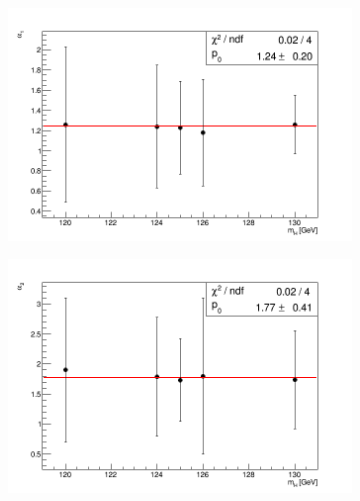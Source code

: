 \documentclass[12pt,a4paper,oneside]{article}
\begin{document}
\begin{linenumbers}
\begin{figure}[H]
			~ %
			\begin{subfigure}[b]{0.49\textwidth}
				\includegraphics[width=\textwidth]{fitanje-alpha1-1-8.png}
				\caption{}
				\label{fig:alpha}
			\end{subfigure}
			\begin{subfigure}[b]{0.49\textwidth}
				\includegraphics[width=\textwidth]{fitanje-alpha2-4-8.png}
				\caption{}
				\label{fig:alpha2}
			\end{subfigure}
		

\end{figure}
\end{linenumbers}
\end{document}
